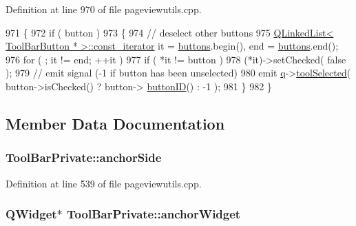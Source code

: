 Definition at line 970 of file pageviewutils.\+cpp.


\begin{DoxyCode}
971 \{
972     \textcolor{keywordflow}{if} ( button )
973     \{
974         \textcolor{comment}{// deselect other buttons}
975         \hyperlink{classQLinkedList}{QLinkedList< ToolBarButton * >::const\_iterator} it = 
      \hyperlink{classToolBarPrivate_a3808da7a9dd822effa1fd0961dc84c0e}{buttons}.begin(), end = \hyperlink{classToolBarPrivate_a3808da7a9dd822effa1fd0961dc84c0e}{buttons}.end();
976         \textcolor{keywordflow}{for} ( ; it != end; ++it )
977             \textcolor{keywordflow}{if} ( *it != button )
978                 (*it)->setChecked( \textcolor{keyword}{false} );
979         \textcolor{comment}{// emit signal (-1 if button has been unselected)}
980         emit \hyperlink{classToolBarPrivate_a05b6db3d3667cbc748dd957a800eec07}{q}->\hyperlink{classPageViewToolBar_a89a0dd0ea468edd6e26b1525e70fedac}{toolSelected}( button->isChecked() ? button->
      \hyperlink{classToolBarButton_a750e0214f1132f48d15000f8537f8c73}{buttonID}() : -1 );
981     \}
982 \}
\end{DoxyCode}


\subsection{Member Data Documentation}
\hypertarget{classToolBarPrivate_ab776848ec81463b3008086418bc55161}{
\subsubsection[{anchor\+Side}]{ Tool\+Bar\+Private\+::anchor\+Side}}\label{classToolBarPrivate_ab776848ec81463b3008086418bc55161}


Definition at line 539 of file pageviewutils.\+cpp.

\hypertarget{classToolBarPrivate_afaae01eea9e15a9a88c02cc1a6636528}{
\subsubsection[{anchor\+Widget}]{\setlength{\rightskip}{0pt plus 5cm}Q\+Widget$\ast$ Tool\+Bar\+Private\+::anchor\+Widget}}\label{classToolBarPrivate_afaae01eea9e15a9a88c02cc1a6636528}


